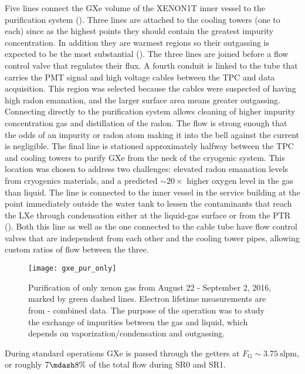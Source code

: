 Five lines connect the GXe volume of the XENON1T inner vessel to the purification system ().  Three lines are
attached to the cooling towers (one to each) since as the highest points they should contain the greatest impurity concentration.  In
addition they are warmest regions so their outgassing is expected to be the most
substantial ().  The three lines are joined before a flow control valve
that regulates their flux.  A fourth conduit is linked to the tube that carries the PMT signal and high voltage cables between the TPC and
data acquisition.  This region was selected because the cables were suspected of having high radon emanation, and the larger surface area
means greater outgassing.  Connecting directly to the purification system allows cleaning of higher impurity concentration gas and
distillation of the radon.  The flow is strong enough that the odds of an impurity or radon atom making it into the bell against the
current is negligible.  The final line is stationed
approximately halfway between the TPC and cooling towers to purify GXe from the neck of the cryogenic system.  This location was
chosen to address two challenges: elevated radon emanation levels from cryogenics materials, and a predicted ${\sim}20\times$ higher
oxygen level in the gas than liquid.  The line is connected to the inner vessel in the service building at the point immediately outside
the water tank to lessen the contaminants that reach the LXe through condensation either at the liquid-gas surface or from the PTR
().  Both this line as well
as the one connected to the cable tube have flow control valves that are independent from each other and the cooling tower pipes, allowing
custom ratios of flow between the three.

\begin{figure}
\centering
\texttt{[image: gxe\_pur\_only]}
\caption{Purification of only xenon gas from August 22 - September 2, 2016, marked by green dashed lines.  Electron lifetime measurements
are from - combined data.  The purpose of the operation was to study the exchange of impurities between the
gas and liquid, which depends on vaporization/condensation and outgassing.}
\label{fig:electron_lifetime_model_gxe_xenon1t}
\end{figure}

During standard operations GXe is passed through the getters at $F_{\mathrm{G}} {\sim} 3.75\ \mathrm{slpm}$, or roughly $7 \mdash 8\%$ of
the total flow during SR0 and SR1.

